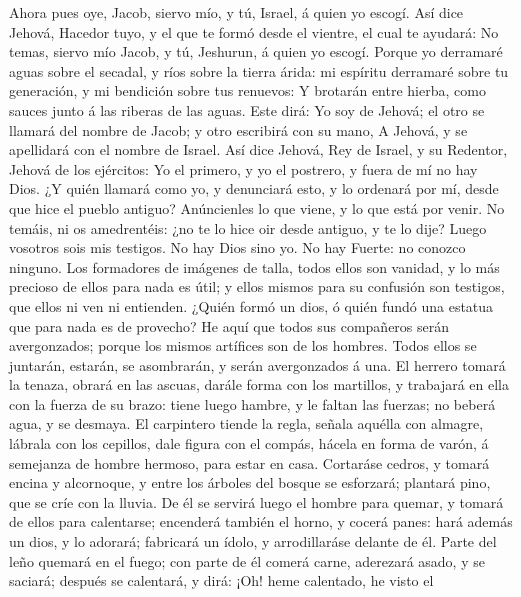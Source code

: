  Ahora pues oye, Jacob, siervo mío, y tú, Israel, á quien yo
escogí.  Así dice Jehová, Hacedor tuyo, y el que te formó
desde el vientre, el cual te ayudará: No temas, siervo mío Jacob, y tú,
Jeshurun, á quien yo escogí.  Porque yo derramaré aguas
sobre el secadal, y ríos sobre la tierra árida: mi espíritu derramaré
sobre tu generación, y mi bendición sobre tus renuevos:  Y
brotarán entre hierba, como sauces junto á las riberas de las aguas.
 Este dirá: Yo soy de Jehová; el otro se llamará del nombre
de Jacob; y otro escribirá con su mano, A Jehová, y se apellidará con el
nombre de Israel.  Así dice Jehová, Rey de Israel, y su
Redentor, Jehová de los ejércitos: Yo el primero, y yo el postrero, y
fuera de mí no hay Dios.  ¿Y quién llamará como yo, y
denunciará esto, y lo ordenará por mí, desde que hice el pueblo antiguo?
Anúncienles lo que viene, y lo que está por venir.  No
temáis, ni os amedrentéis: ¿no te lo hice oir desde antiguo, y te lo
dije? Luego vosotros sois mis testigos. No hay Dios sino yo. No hay
Fuerte: no conozco ninguno.  Los formadores de imágenes de
talla, todos ellos son vanidad, y lo más precioso de ellos para nada es
útil; y ellos mismos para su confusión son testigos, que ellos ni ven ni
entienden.  ¿Quién formó un dios, ó quién fundó una estatua
que para nada es de provecho?  He aquí que todos sus
compañeros serán avergonzados; porque los mismos artífices son de los
hombres. Todos ellos se juntarán, estarán, se asombrarán, y serán
avergonzados á una.  El herrero tomará la tenaza, obrará en
las ascuas, darále forma con los martillos, y trabajará en ella con la
fuerza de su brazo: tiene luego hambre, y le faltan las fuerzas; no
beberá agua, y se desmaya.  El carpintero tiende la regla,
señala aquélla con almagre, lábrala con los cepillos, dale figura con el
compás, hácela en forma de varón, á semejanza de hombre hermoso, para
estar en casa.  Cortaráse cedros, y tomará encina y
alcornoque, y entre los árboles del bosque se esforzará; plantará pino,
que se críe con la lluvia.  De él se servirá luego el
hombre para quemar, y tomará de ellos para calentarse; encenderá también
el horno, y cocerá panes: hará además un dios, y lo adorará; fabricará
un ídolo, y arrodillaráse delante de él.  Parte del leño
quemará en el fuego; con parte de él comerá carne, aderezará asado, y se
saciará; después se calentará, y dirá: ¡Oh! heme calentado, he visto el
